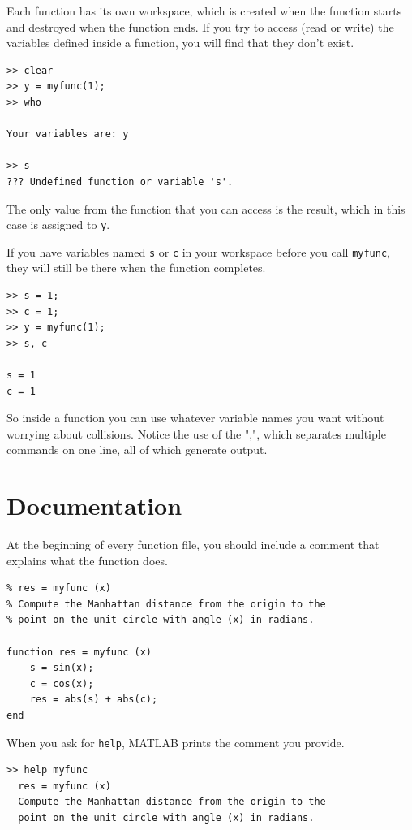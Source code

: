 \documentclass[
]{book}
\begin{document}
Each function has its own workspace, which is created when the
function starts and destroyed when the function ends.  If you try to
access (read or write) the variables defined inside a function, you
will find that they don't exist.

\begin{verbatim}
>> clear
>> y = myfunc(1);
>> who

Your variables are: y

>> s
??? Undefined function or variable 's'.
\end{verbatim}

The only value from the function that you can access is the result,
which in this case is assigned to {\tt y}.

If you have variables named {\tt s} or {\tt c} in your workspace
before you call {\tt myfunc}, they will still be there when the
function completes.

\begin{verbatim}
>> s = 1;
>> c = 1;
>> y = myfunc(1);
>> s, c

s = 1
c = 1
\end{verbatim}

So inside a function you can use whatever variable names you
want without worrying about collisions.
Notice the use of the ",", which separates multiple commands on
one line, all of which generate output.


\section{Documentation}

At the beginning of every function file, you should include a comment
that explains what the function does.

\begin{verbatim}
% res = myfunc (x)
% Compute the Manhattan distance from the origin to the
% point on the unit circle with angle (x) in radians.

function res = myfunc (x)
    s = sin(x);
    c = cos(x);
    res = abs(s) + abs(c);
end
\end{verbatim}

When you ask for {\tt help}, MATLAB prints the comment you
provide.

\begin{verbatim}
>> help myfunc
  res = myfunc (x)
  Compute the Manhattan distance from the origin to the
  point on the unit circle with angle (x) in radians.
\end{verbatim}
\end{document}
